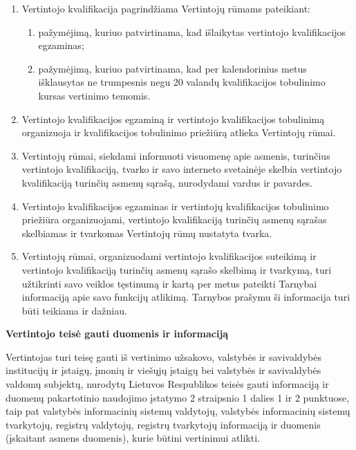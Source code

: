 \begin{enumerate}
    \item Vertintojo kvalifikacija pagrindžiama Vertintojų rūmams pateikiant:
    \begin{enumerate}
        \item pažymėjimą, kuriuo patvirtinama, kad išlaikytas vertintojo kvalifikacijos egzaminas;
        \item pažymėjimą, kuriuo patvirtinama, kad per kalendorinius metus išklausytas ne trumpesnis negu 20 valandų kvalifikacijos tobulinimo kursas vertinimo temomis.
    \end{enumerate}
        \item Vertintojo kvalifikacijos egzaminą ir vertintojo kvalifikacijos tobulinimą organizuoja ir kvalifikacijos tobulinimo priežiūrą atlieka Vertintojų rūmai.
        \item Vertintojų rūmai, siekdami informuoti visuomenę apie asmenis, turinčius vertintojo kvalifikaciją, tvarko ir savo interneto svetainėje skelbia vertintojo kvalifikaciją turinčių asmenų sąrašą, nurodydami vardus ir pavardes.
        \item Vertintojo kvalifikacijos egzaminas ir vertintojų kvalifikacijos tobulinimo priežiūra organizuojami, vertintojo kvalifikaciją turinčių asmenų sąrašas skelbiamas ir tvarkomas Vertintojų rūmų nustatyta tvarka.
        \item Vertintojų rūmai, organizuodami vertintojo kvalifikacijos suteikimą ir vertintojo kvalifikaciją turinčių asmenų sąrašo skelbimą ir tvarkymą, turi užtikrinti savo veiklos tęstinumą ir kartą per metus pateikti Tarnybai informaciją apie savo funkcijų atlikimą. Tarnybos prašymu ši informacija turi būti teikiama ir dažniau.
\end{enumerate}

\textbf{Vertintojo teisė gauti duomenis ir informaciją}

Vertintojas turi teisę gauti iš vertinimo užsakovo, valstybės ir savivaldybės institucijų ir įstaigų, įmonių ir viešųjų įstaigų bei valstybės ir savivaldybės valdomų subjektų, nurodytų Lietuvos Respublikos teisės gauti informaciją ir duomenų pakartotinio naudojimo įstatymo 2 straipsnio 1 dalies 1 ir 2 punktuose, taip pat valstybės informacinių sistemų valdytojų, valstybės informacinių sistemų tvarkytojų, registrų valdytojų, registrų tvarkytojų informaciją ir duomenis (įskaitant asmens duomenis), kurie būtini vertinimui atlikti.


